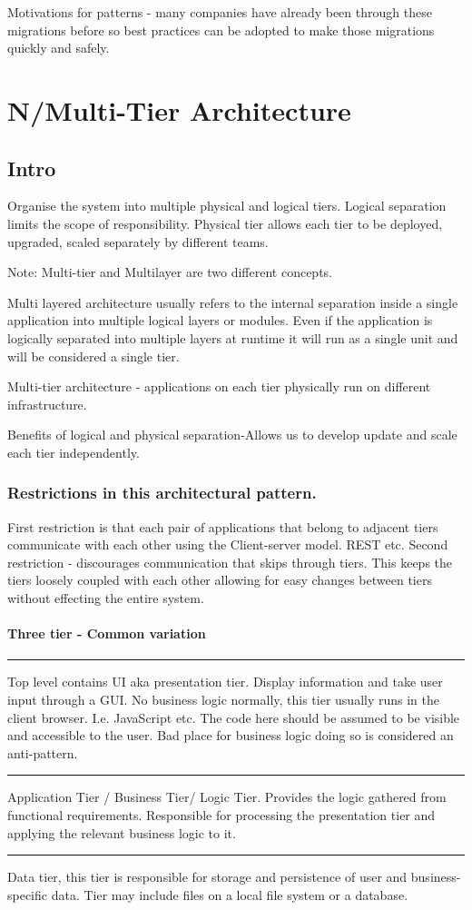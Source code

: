 Motivations for patterns - many companies have already been through these migrations before so best practices can be adopted to make those migrations quickly and safely.


\section{N/Multi-Tier Architecture}

\subsection{Intro}
Organise the system into multiple physical and logical tiers.
Logical separation limits the scope of responsibility.
Physical tier allows each tier to be deployed, upgraded, scaled separately by different teams.

\begin{note}
    Note: Multi-tier and Multilayer are two different concepts.
\end{note}
Multi layered architecture usually refers to the internal separation inside a single application into multiple logical layers or modules.
Even if the application is logically separated into multiple layers at runtime it will run as a single unit and will be considered a single tier.

Multi-tier architecture - applications on each tier physically run on different infrastructure.

Benefits of logical and physical separation-Allows us to develop update and scale each tier independently.

\subsubsection{Restrictions in this architectural pattern.}
First restriction is that each pair of applications that belong to adjacent tiers communicate with each other using the Client-server model.
REST etc.
Second restriction - discourages communication that skips through tiers.
This keeps the tiers loosely coupled with each other allowing for easy changes between tiers without effecting the entire system.

\paragraph{Three tier - Common variation}
\hrule
Top level contains UI aka presentation tier.
Display information and take user input through a GUI\@.
No business logic normally, this tier usually runs in the client browser.
I.e. JavaScript etc.
The code here should be assumed to be visible and accessible to the user.
Bad place for business logic doing so is considered an anti-pattern.
\hrule
Application Tier / Business Tier/ Logic Tier.
Provides the logic gathered from functional requirements.
Responsible for processing the presentation tier and applying the relevant business logic to it.
\hrule
Data tier, this tier is responsible for storage and persistence of user and business-specific data.
Tier may include files on a local file system or a database.

